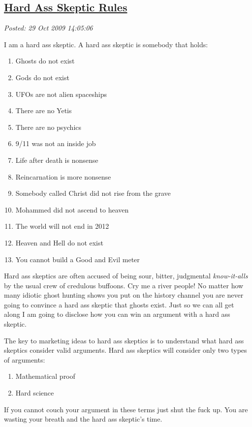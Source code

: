 %

\subsection*{\href{https://bakerjd99.wordpress.com/2009/10/29/hard-ass-skeptic-rules/}{Hard Ass Skeptic Rules}}


\noindent\emph{Posted: 29 Oct 2009 14:05:06}
\vspace{6pt}

I am a hard ass skeptic. A hard ass skeptic is somebody that holds:

\begin{enumerate}
\item
  Ghosts do not exist
\item
  Gods do not exist
\item
  UFOs are not alien spaceships
\item
  There are no Yetis
\item
  There are no psychics
\item
  9/11 was not an inside job
\item
  Life after death is nonsense
\item
  Reincarnation is more nonsense
\item
  Somebody called Christ did not rise from the grave
\item
  Mohammed did not ascend to heaven
\item
  The world will not end in 2012
\item
  Heaven and Hell do not exist
\item
  You cannot build a Good and Evil meter
\end{enumerate}
Hard ass skeptics are often accused of being sour, bitter, judgmental
\emph{know-it-alls} by the usual crew of credulous buffoons. Cry me a
river people! No matter how many idiotic ghost hunting shows you put on
the history channel you are never going to convince a hard ass skeptic
that ghosts exist. Just so we can all get along I am going to disclose
how you can win an argument with a hard ass skeptic.

The key to marketing ideas to hard ass skeptics is to understand what
hard ass skeptics consider valid arguments. Hard ass skeptics will
consider only two types of arguments:

\begin{enumerate}
\item
  Mathematical proof
\item
  Hard science
\end{enumerate}
If you cannot couch your argument in these terms just shut the fuck up.
You are wasting your breath and the hard ass skeptic's time.

